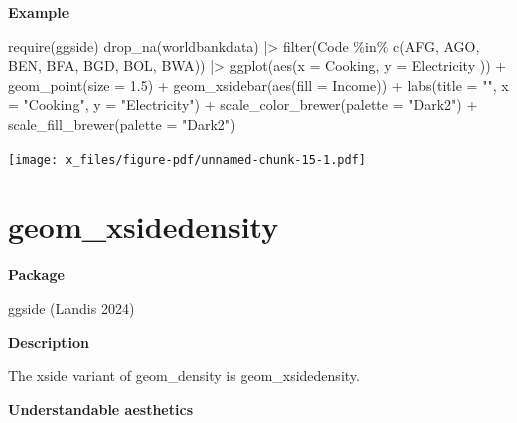 \documentclass[
  letterpaper,
  DIV=11,
  numbers=noendperiod]{scrreprt}
\newenvironment{Shaded}{\begin{snugshade}}{\end{snugshade}}
\newcommand{\AttributeTok}[1]{\textcolor[rgb]{0.40,0.45,0.13}{#1}}
\newcommand{\FloatTok}[1]{\textcolor[rgb]{0.68,0.00,0.00}{#1}}
\newcommand{\FunctionTok}[1]{\textcolor[rgb]{0.28,0.35,0.67}{#1}}
\newcommand{\NormalTok}[1]{\textcolor[rgb]{0.00,0.23,0.31}{#1}}
\newcommand{\SpecialCharTok}[1]{\textcolor[rgb]{0.37,0.37,0.37}{#1}}
\newcommand{\StringTok}[1]{\textcolor[rgb]{0.13,0.47,0.30}{#1}}
\begin{document}
\textbf{Example }

\begin{Shaded}
\begin{Highlighting}[]
\FunctionTok{require}\NormalTok{(ggside)}
\FunctionTok{drop\_na}\NormalTok{(worldbankdata) }\SpecialCharTok{|\textgreater{}}
  \FunctionTok{filter}\NormalTok{(Code }\SpecialCharTok{\%in\%} \FunctionTok{c}\NormalTok{(}\StringTok{\textquotesingle{}AFG\textquotesingle{}}\NormalTok{, }\StringTok{\textquotesingle{}AGO\textquotesingle{}}\NormalTok{, }\StringTok{\textquotesingle{}BEN\textquotesingle{}}\NormalTok{, }\StringTok{\textquotesingle{}BFA\textquotesingle{}}\NormalTok{, }\StringTok{\textquotesingle{}BGD\textquotesingle{}}\NormalTok{, }\StringTok{\textquotesingle{}BOL\textquotesingle{}}\NormalTok{, }\StringTok{\textquotesingle{}BWA\textquotesingle{}}\NormalTok{)) }\SpecialCharTok{|\textgreater{}}
  \FunctionTok{ggplot}\NormalTok{(}\FunctionTok{aes}\NormalTok{(}\AttributeTok{x =}\NormalTok{ Cooking, }\AttributeTok{y =}\NormalTok{ Electricity )) }\SpecialCharTok{+}
  \FunctionTok{geom\_point}\NormalTok{(}\AttributeTok{size =} \FloatTok{1.5}\NormalTok{) }\SpecialCharTok{+} 
  \FunctionTok{geom\_xsidebar}\NormalTok{(}\FunctionTok{aes}\NormalTok{(}\AttributeTok{fill =}\NormalTok{ Income)) }\SpecialCharTok{+}
  \FunctionTok{labs}\NormalTok{(}\AttributeTok{title =} \StringTok{""}\NormalTok{, }\AttributeTok{x =} \StringTok{"Cooking"}\NormalTok{, }\AttributeTok{y =} \StringTok{"Electricity"}\NormalTok{) }\SpecialCharTok{+} \FunctionTok{scale\_color\_brewer}\NormalTok{(}\AttributeTok{palette =} \StringTok{"Dark2"}\NormalTok{) }\SpecialCharTok{+} \FunctionTok{scale\_fill\_brewer}\NormalTok{(}\AttributeTok{palette =} \StringTok{"Dark2"}\NormalTok{)}
\end{Highlighting}
\end{Shaded}

\texttt{[image: x\_files/figure-pdf/unnamed-chunk-15-1.pdf]}

\section{geom\_xsidedensity}\label{xsidedensity}

\textbf{Package}

ggside (Landis 2024)

\textbf{Description}

The xside variant of geom\_density is geom\_xsidedensity.

\textbf{Understandable aesthetics}
\end{document}
